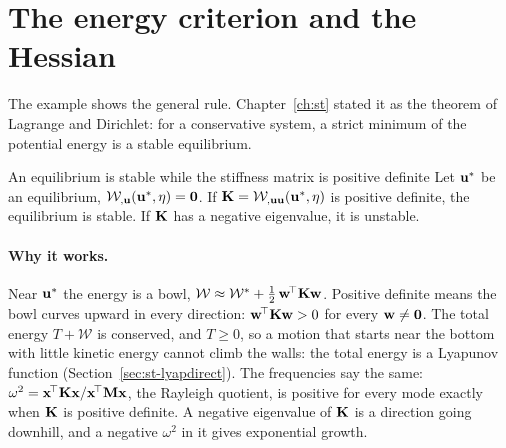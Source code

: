 \section{The energy criterion and the Hessian}\label{sec:ld-hessian}
%

The example shows the general rule. Chapter~\ref{ch:st} stated it as the theorem of
Lagrange and Dirichlet: for a conservative system, a strict minimum of the potential
energy is a stable equilibrium.

\begin{gbox}{An equilibrium is stable while the stiffness matrix is positive definite}\label{sec:ld-energycrit}
%
Let $\mathbf{u}^*$ be an equilibrium, $\mathcal{W}_{,\mathbf{u}}(\mathbf{u}^*,\eta) = \mathbf{0}$. If
$\mathbf{K} = \mathcal{W}_{,\mathbf{u}\mathbf{u}}(\mathbf{u}^*,\eta)$ is positive definite, the
equilibrium is stable. If $\mathbf{K}$ has a negative eigenvalue, it is unstable.
\end{gbox}

\paragraph{Why it works.}
Near $\mathbf{u}^*$ the energy is a bowl,
$\mathcal{W} \approx \mathcal{W}^* + \tfrac12\,\mathbf{w}^{\!\top}\mathbf{K}\mathbf{w}$. Positive definite
means the bowl curves upward in every direction: $\mathbf{w}^{\!\top}\mathbf{K}\mathbf{w} > 0$ for every
$\mathbf{w} \neq \mathbf{0}$. The total energy $T + \mathcal{W}$ is conserved, and $T \ge 0$,
so a motion that starts near the bottom with little kinetic energy cannot climb the
walls: the total energy is a Lyapunov function (Section~\ref{sec:st-lyapdirect}).
The frequencies say the same: $\omega^2 = \mathbf{x}^{\!\top}\mathbf{K}\mathbf{x}/\mathbf{x}^{\!\top}\mathbf{M}\mathbf{x}$,
the Rayleigh quotient, is positive for every mode exactly when $\mathbf{K}$ is positive
definite. A negative eigenvalue of $\mathbf{K}$ is a direction going downhill, and a
negative $\omega^2$ in it gives exponential growth.

